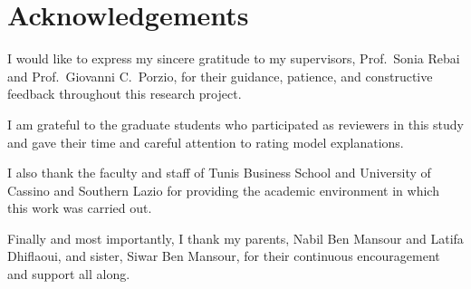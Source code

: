 \chapter*{Acknowledgements}

I would like to express my sincere gratitude to my supervisors, Prof.\ Sonia Rebai
and Prof.\ Giovanni C.\ Porzio, for their guidance, patience, and constructive
feedback throughout this research project.

I am grateful to the graduate students who participated as reviewers in this study
and gave their time and careful attention to rating model explanations.

I also thank the faculty and staff of Tunis Business School and University of Cassino and Southern Lazio for providing the
academic environment in which this work was carried out.

Finally and most importantly, I thank my parents, Nabil Ben Mansour and Latifa Dhiflaoui, and sister, Siwar Ben Mansour, for their continuous encouragement and support all along.

